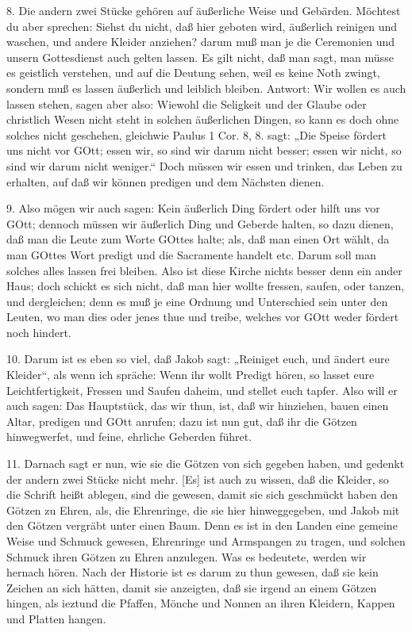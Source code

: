 8. Die andern zwei Stücke gehören auf äußerliche Weise und Gebärden. Möchtest du aber sprechen: Siehst du nicht, daß hier geboten wird, äußerlich reinigen und waschen, und andere Kleider anziehen? darum muß man je die Ceremonien und unsern Gottesdienst auch gelten lassen. Es gilt nicht, daß man sagt, man müsse es geistlich verstehen, und auf die Deutung sehen, weil es keine Noth zwingt, sondern muß es lassen äußerlich und leiblich bleiben. Antwort: Wir wollen es auch lassen stehen, sagen aber also: Wiewohl die Seligkeit und der Glaube oder christlich Wesen nicht steht in solchen äußerlichen Dingen, so kann es doch ohne solches nicht geschehen, gleichwie Paulus 1 Cor. 8, 8. sagt: „Die Speise fördert uns nicht vor GOtt; essen wir, so sind wir darum nicht besser; essen wir nicht, so sind wir darum nicht weniger.“ Doch müssen wir essen und trinken, das Leben zu erhalten, auf daß wir können predigen und dem Nächsten dienen.

9. Also mögen wir auch sagen: Kein äußerlich Ding fördert oder hilft uns vor GOtt; dennoch müssen wir äußerlich Ding und Geberde halten, so dazu dienen, daß man die Leute zum Worte GOttes halte; als, daß man einen Ort wählt, da man GOttes Wort predigt und die Sacramente handelt etc. Darum soll man solches alles lassen frei bleiben. Also ist diese Kirche nichts besser denn ein ander Haus; doch schickt es sich nicht, daß man hier wollte fressen, saufen, oder tanzen, und dergleichen; denn es muß je eine Ordnung und Unterschied sein unter den Leuten, wo man dies oder jenes thue und treibe, welches vor GOtt weder fördert noch hindert.

10. Darum ist es eben so viel, daß Jakob sagt: „Reiniget euch, und ändert eure Kleider“, als wenn ich spräche: Wenn ihr wollt Predigt hören, so lasset eure Leichtfertigkeit, Fressen und Saufen daheim, und stellet euch tapfer. Also will er auch sagen: Das Hauptstück, das wir thun, ist, daß wir hinziehen, bauen einen Altar, predigen und GOtt anrufen; dazu ist nun gut, daß ihr die Götzen hinwegwerfet, und feine, ehrliche Geberden führet.

11. Darnach sagt er nun, wie sie die Götzen von sich gegeben haben, und gedenkt der andern zwei Stücke nicht mehr. [Es] ist auch zu wissen, daß die Kleider, so die Schrift heißt ablegen, sind die gewesen, damit sie sich geschmückt haben den Götzen zu Ehren, als, die Ehrenringe, die sie hier hinweggegeben, und Jakob mit den Götzen vergräbt unter einen Baum. Denn es ist in den Landen eine gemeine Weise und Schmuck gewesen, Ehrenringe und Armspangen zu tragen, und solchen Schmuck ihren Götzen zu Ehren anzulegen. Was es bedeutete, werden wir hernach hören. Nach der Historie ist es darum zu thun gewesen, daß sie kein Zeichen an sich hätten, damit sie anzeigten, daß sie irgend an einem Götzen hingen, als ieztund die Pfaffen, Mönche und Nonnen an ihren Kleidern, Kappen und Platten hangen.

